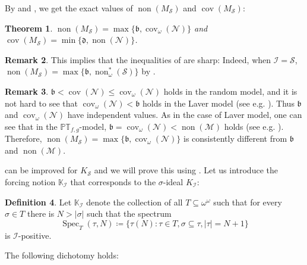 \documentclass[a4paper,12pt]{amsart}
\newtheorem{thm}{Theorem}
\theoremstyle{definition}
\newtheorem{dfn}[thm]{Definition}
\newtheorem{rem}[thm]{Remark}
\numberwithin{thm}{section}
\numberwithin{equation}{section}
\newcommand{\bb}{\mathfrak{b}}
\DeclareMathOperator{\non}{non}
\DeclareMathOperator{\cov}{cov}
\newcommand{\nonm}{\non(\mathcal{M})}
\newcommand{\covn}{\cov(\mathcal{N})}
\newcommand{\I}{\mathscr{I}}
\newcommand{\covomn}{\operatorname{cov}_\omega(\mathcal{N})}
\DeclareMathOperator{\Spec}{Spec}
\newcommand{\baire}{\omega^\omega}
\newcommand{\Solecki}{\mathcal{S}}
\begin{document}
    By  and , we get the exact values of $\non(M_\mathcal{S})$ and $\cov(M_\mathcal{S})$:
    
    \begin{thm}\label{thm:M_S_exact}
        $\non(M_\mathcal{S}) = \max\{\mathfrak{b}, \cov_\omega(\mathcal{N})\}$ and $\cov(M_\mathcal{S}) = \min\{\mathfrak{d}, \non(\mathcal{N})\}$.
    \end{thm}

    \begin{rem} \label{rem:Solecki_optimal}
        This implies that the inequalities of  are sharp: Indeed, when $\I=\Solecki$, $\non(M_\mathcal{S}) =\max\{\mathfrak{b}, \non^*_\omega(\Solecki)\}$ by .
    \end{rem}

    \begin{rem}
         $\bb<\covn\leq\covomn$ holds in the random model, and it is not hard to see that $\cov_\omega(\mathcal{N})<\bb$ holds in the Laver model (see e.g. \cite[Lemma 7.2.3]{BJ95}). Thus $\bb$ and $\covomn$ have independent values. As in the case of Laver model, one can see that in the $\mathbb{PT}_{f,g}$-model, $\bb=\cov_\omega(\mathcal{N})<\nonm$ holds (see e.g. \cite[Lemma 7.2.15]{BJ95}). Therefore, $\non(M_\Solecki) = \max\{\mathfrak{b}, \cov_\omega(\mathcal{N})\}$ is consistently different from $\bb$ and $\nonm$.
    \end{rem}

     can be improved for $K_\Solecki$ and we will prove this using . Let us introduce the forcing notion $\mathbb{K}_{\I}$ that corresponds to the $\sigma$-ideal $K_\I$:
    
    \begin{dfn}
        Let $\mathbb{K}_{\I}$ denote the collection of all $T\subseteq\baire$ such that for every $\sigma\in T$ there is $N>|\sigma|$ such that the spectrum
        \[
        \Spec_T(\tau,N)\coloneqq\{\tau(N):\tau\in T, \sigma\subseteq\tau, |\tau|=N+1\}
        \]
        is $\I$-positive.
    \end{dfn}

    The following dichotomy holds:
\end{document}
